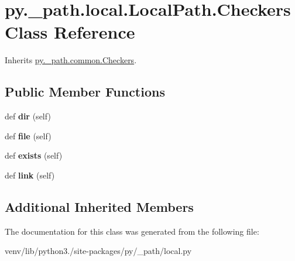 \hypertarget{classpy_1_1__path_1_1local_1_1_local_path_1_1_checkers}{}\section{py.\+\_\+path.\+local.\+Local\+Path.\+Checkers Class Reference}
\label{classpy_1_1__path_1_1local_1_1_local_path_1_1_checkers}


Inherits \hyperlink{classpy_1_1__path_1_1common_1_1_checkers}{py.\+\_\+path.\+common.\+Checkers}.

\subsection*{Public Member Functions}
\begin{DoxyCompactItemize}
\item 
\mbox{\label{classpy_1_1__path_1_1local_1_1_local_path_1_1_checkers_a58ccadb8b442e67d077f8db18b214f14}} 
def {\bfseries dir} (self)
\item 
\mbox{\label{classpy_1_1__path_1_1local_1_1_local_path_1_1_checkers_a39d19a60c8d88b27224705d4aae29e3e}} 
def {\bfseries file} (self)
\item 
\mbox{\label{classpy_1_1__path_1_1local_1_1_local_path_1_1_checkers_a3cb02327115adf9c027ce3b5415cc2b9}} 
def {\bfseries exists} (self)
\item 
\mbox{\label{classpy_1_1__path_1_1local_1_1_local_path_1_1_checkers_ae409d117d0ff6784545b57de80981db6}} 
def {\bfseries link} (self)
\end{DoxyCompactItemize}
\subsection*{Additional Inherited Members}


The documentation for this class was generated from the following file\+:\begin{DoxyCompactItemize}
\item 
venv/lib/python3./site-\/packages/py/\+\_\+path/local.\+py\end{DoxyCompactItemize}
